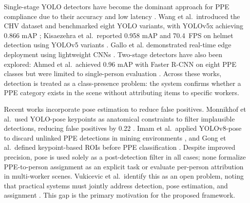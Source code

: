 \documentclass[conference]{IEEEtran}
\begin{document}
Single-stage YOLO detectors have become the dominant approach for PPE compliance due to their accuracy and low latency \cite{ref6}. Wang et al.\ introduced the CHV dataset and benchmarked eight YOLO variants, with YOLOv5x achieving 0.866 mAP \cite{ref5}; Kisaezehra et al.\ reported 0.958 mAP and 70.4~FPS on helmet detection using YOLOv5 variants \cite{ref9}. Gallo et al. demonstrated real-time edge deployment using lightweight CNNs \cite{ref14}. Two-stage detectors have also been explored: Ahmed et al.\ achieved 0.96 mAP with Faster R-CNN on eight PPE classes but were limited to single-person evaluation \cite{ref23}. Across these works, detection is treated as a class-presence problem: the system confirms whether a PPE category exists in the scene without attributing items to specific workers.

Recent works incorporate pose estimation to reduce false positives. Monnikhof et al.\ used YOLO-pose keypoints as anatomical constraints to filter implausible detections, reducing false positives by 0.22 \cite{ref8}. Imam et al.\ applied YOLOv8-pose to discard unlinked PPE detections in mining environments \cite{ref12}, and Gong et al.\ defined keypoint-based ROIs before PPE classification \cite{ref13}. Despite improved precision, pose is used solely as a post-detection filter in all cases; none formalize PPE-to-person assignment as an explicit task or evaluate per-person attribution in multi-worker scenes. Vukicevic et al.\ identify this as an open problem, noting that practical systems must jointly address detection, pose estimation, and assignment \cite{ref6}. This gap is the primary motivation for the proposed framework.
\end{document}

